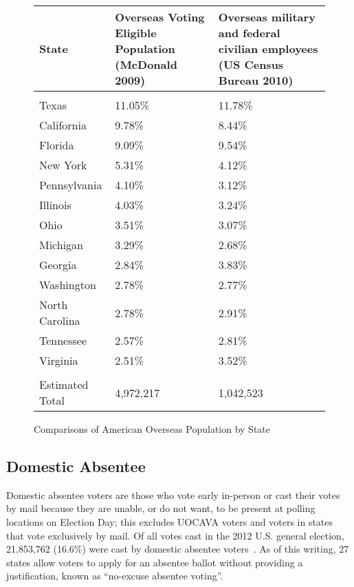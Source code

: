
\begin{figure}
\begin{center}
\begin{tabular}{l p{} p{}} %
  {\bf State} &
  {\bf Overseas Voting Eligible \newline Population} \newline(McDonald 2009) &
  {\bf Overseas military and federal \newline civilian employees}
  \newline(US Census Bureau 2010)\\\hline\\
Texas & 11.05\% & 11.78\%\\
California & 9.78\% & 8.44\% \\
Florida & 9.09\% & 9.54\% \\
New York & 5.31\% & 4.12\% \\
Pennsylvania & 4.10\% & 3.12\% \\
Illinois & 4.03\% & 3.24\% \\
Ohio & 3.51\% & 3.07\% \\
Michigan & 3.29\% & 2.68\% \\
Georgia & 2.84\% & 3.83\% \\
Washington & 2.78\% & 2.77\% \\
North Carolina & 2.78\% & 2.91\% \\
Tennessee & 2.57\% & 2.81\% \\
Virginia & 2.51\% & 3.52\% \\\hline\\
Estimated Total & 4,972,217 & 1,042,523
\end{tabular}
\end{center}
\caption{Comparisons of American Overseas Population by State}
\label{fig:uocava_populations} %
\end{figure}

\subsection{Domestic Absentee}
Domestic absentee voters are those who vote early in-person or cast
their votes by mail because they are unable, or do not want, to be
present at polling locations on Election Day; this excludes UOCAVA
voters and voters in states that vote exclusively by mail. Of all
votes cast in the 2012 U.S. general election, 21,853,762 (16.6\%) were
cast by domestic absentee voters~\cite{eac2012survey}. As of this
writing, 27 states allow voters to apply for an absentee ballot
without providing a justification, known as ``no-excuse absentee
voting''.

